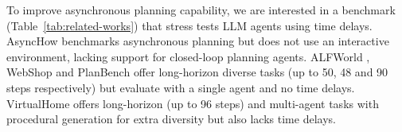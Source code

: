 

To improve asynchronous planning capability, we are interested in a benchmark (Table~\ref{tab:related-works}) that stress tests LLM agents using time delays.
AsyncHow \cite{lin2024graphenhancedlargelanguagemodels} benchmarks asynchronous planning but does not use an interactive environment, lacking support for closed-loop planning agents.
ALFWorld \citep{shridhar2021alfworldaligningtextembodied}, WebShop \citep{yao2023webshopscalablerealworldweb} and PlanBench \citep{valmeekam2023planbenchextensiblebenchmarkevaluating} offer long-horizon diverse tasks (up to 50, 48 and 90 steps respectively) but evaluate with a single agent and no time delays. VirtualHome \citep{puig2018virtualhomesimulatinghouseholdactivities} offers long-horizon (up to 96 steps) and multi-agent tasks with procedural generation for extra diversity but also lacks time delays.


